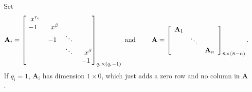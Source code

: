 Set \[
\mathbf{A}_{i}=\begin{bmatrix}~~x^{r_{i}}\\
-1 & ~~x^{\beta}\\
 & -1 & \ddots\\
 &  & \ddots & ~~x^{\beta}\\
 &  &  & -1\end{bmatrix}_{q_{i}\times(q_{i}-1)}\mbox{ and \qquad}\mathbf{A}=\left[\begin{array}{ccc}
\mathbf{A}_{1}\\
 & \ddots\\
 &  & \mathbf{A}_{n}\end{array}\right]_{\bar{n}\times(\bar{n}-n)}.\]
 If $q_{i}=1$, $\mathbf{A}_{i}$ has dimension $1\times0$, which
just adds a zero row and no column in $\mathbf{A}$.

